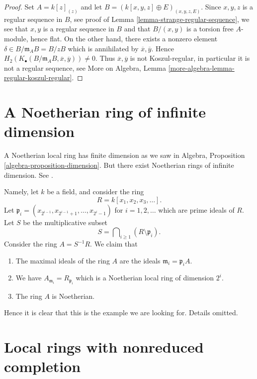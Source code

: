 \begin{proof}
Set $A = k[z]_{(z)}$ and let $B = (k[x, y, z] \oplus E)_{(x, y, z, E)}$.
Since $x, y, z$ is a regular sequence in $B$, see proof of
Lemma \ref{lemma-strange-regular-sequence},
we see that $x, y$ is a regular sequence in $B$ and that
$B/(x, y)$ is a torsion free $A$-module, hence flat.
On the other hand, there exists a nonzero element
$\delta \in B/\mathfrak m_AB = B/zB$ which is annihilated
by $\overline{x}, \overline{y}$. Hence
$H_2(K_\bullet(B/\mathfrak m_AB, \overline{x}, \overline{y})) \not = 0$.
Thus $\overline{x}, \overline{y}$ is not Koszul-regular, in particular
it is not a regular sequence, see
More on Algebra, Lemma \ref{more-algebra-lemma-regular-koszul-regular}.
\end{proof}





\section{A Noetherian ring of infinite dimension}
\label{section-Noetherian-infinite-dimension}

\noindent
A Noetherian local ring has finite dimension as we saw in
Algebra, Proposition \ref{algebra-proposition-dimension}.
But there exist Noetherian rings of infinite dimension.
See \cite[Appendix, Example 1]{Nagata}.

\medskip\noindent
Namely, let $k$ be a field, and consider the ring
$$
R = k[x_1, x_2, x_3, \ldots ].
$$
Let $\mathfrak p_i = (x_{2^{i - 1}}, x_{2^{i - 1} + 1}, \ldots, x_{2^i - 1})$
for $i = 1, 2, \ldots$ which are prime ideals of $R$. Let $S$
be the multiplicative subset
$$
S = \bigcap\nolimits_{i \geq 1} (R \setminus \mathfrak p_i).
$$
Consider the ring $A = S^{-1}R$.
We claim that
\begin{enumerate}
\item The maximal ideals of the ring $A$ are the ideals
$\mathfrak m_i = \mathfrak p_iA$.
\item We have $A_{\mathfrak m_i} = R_{\mathfrak p_i}$ which is
a Noetherian local ring of dimension $2^i$.
\item The ring $A$ is Noetherian.
\end{enumerate}
Hence it is clear that this is the example we are looking for.
Details omitted.




\section{Local rings with nonreduced completion}
\label{section-local-completion-nonreduced}

